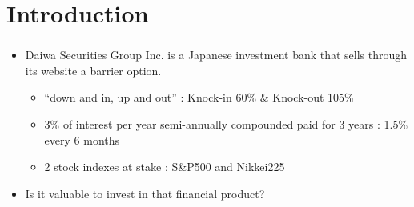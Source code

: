 \section{Introduction}

\begin{frame}[c]
\frametitle{\insertsection}
\begin{itemize}
	\item Daiwa Securities Group Inc. is a Japanese investment bank that sells through its website a barrier option. %
	\begin{itemize}
		\item “down and in, up and out” : Knock-in 60\% \& Knock-out 105\%
		\item 3\% of interest per year semi-annually compounded paid for 3 years : 1.5\% every 6 months
		\item 2 stock indexes at stake : S\&P500 and Nikkei225
	\end{itemize}
	\item Is it valuable to invest in that financial product?
\end{itemize}
\end{frame}